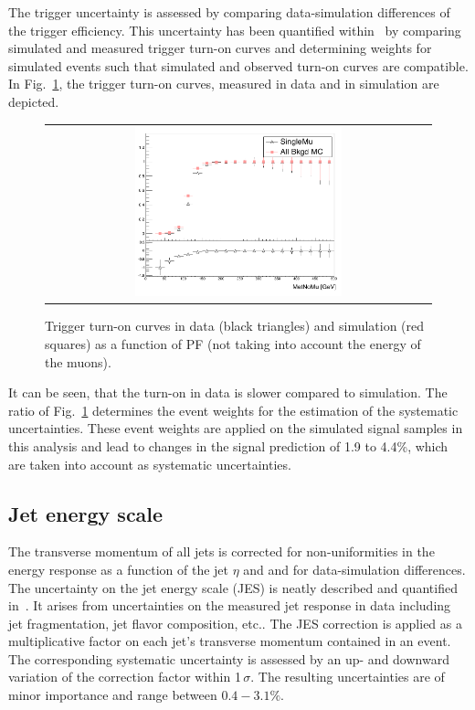The trigger uncertainty is assessed by comparing data-simulation differences of the trigger efficiency.
This uncertainty has been quantified within~\cite{bib:CMS:DT_Thesis,bib:CMS:DT_8TeV_AN} by comparing simulated and measured trigger turn-on curves and determining weights for simulated events such that simulated and observed turn-on curves are compatible.
In Fig.~\ref{fig:TriggerTurnOn}, the trigger turn-on curves, measured in data and in simulation are depicted.
\begin{figure}[!b]
  \centering 
  \begin{tabular}{c}
    \includegraphics[width=0.55\textwidth]{figures/analysis_2/Interpretation/TriggerEfficiency.png} 
  \end{tabular}
  \caption{Trigger turn-on curves in data (black triangles) and simulation (red squares) as a function of PF \met (not taking into account the energy of the muons).}
  \label{fig:TriggerTurnOn}
\end{figure} 
It can be seen, that the turn-on in data is slower compared to simulation.
The ratio of Fig.~\ref{fig:TriggerTurnOn} determines the event weights for the estimation of the systematic uncertainties.
These event weights are applied on the simulated signal samples in this analysis and lead to changes in the signal prediction of 1.9 to 4.4\%, which are taken into account as systematic uncertainties.


\subsection*{Jet energy scale}
The transverse momentum of all jets is corrected for non-uniformities in the energy response as a function of the jet $\eta$ and \pt and for data-simulation differences.
The uncertainty on the jet energy scale (JES) is neatly described and quantified in~\cite{bib:CMS:JME_PAS}. 
It arises from uncertainties on the measured jet response in data including jet fragmentation, jet flavor composition, etc..
The JES correction is applied as a multiplicative factor on each jet's transverse momentum contained in an event.
The corresponding systematic uncertainty is assessed by an up- and downward variation of the correction factor within 1\,$\sigma$.
The resulting uncertainties are of minor importance and range between $0.4-3.1\%$.

